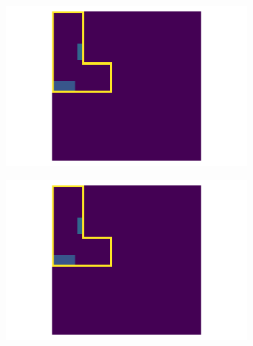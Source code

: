 \documentclass[binding=0.6cm,noexaminfo]{sapthesis}
\begin{document}
\begin{figure}[h!]
\begin{subfigure}{.49\textwidth}
	\centering
	\includegraphics[width=.90\linewidth]{results/top_pred_2}
	\caption{}
\end{subfigure}
\begin{subfigure}{.49\textwidth}
	\centering
	\includegraphics[width=.90\linewidth]{results/top_true_2}
	\caption{}
\end{subfigure}


\end{figure}
\end{document}
